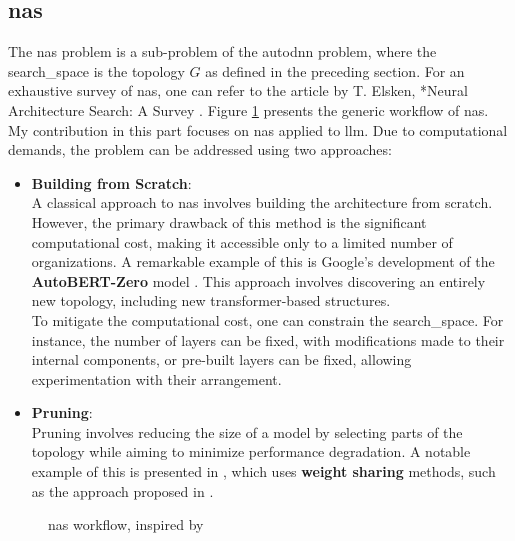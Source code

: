 \subsection{\acrfull{nas}}
\label{sec : nas}

The \acrfull{nas} problem is a sub-problem of the \acrshort{autodnn} problem, where the \gls{search_space} is the topology \( G \) as defined in the preceding section. For an exhaustive survey of \acrshort{nas}, one can refer to the article by T. Elsken, *Neural Architecture Search: A Survey \cite{elsken_neural_2019}. Figure \ref{fig:nas} presents the generic workflow of \acrshort{nas}. My contribution in this part focuses on \acrshort{nas} applied to \acrshort{llm}. Due to computational demands, the problem can be addressed using two approaches:

\begin{itemize}
    

    \item \textbf{Building from Scratch}:\\
    A classical approach to \acrlong{nas} involves building the architecture from scratch. However, the primary drawback of this method is the significant computational cost, making it accessible only to a limited number of organizations. A remarkable example of this is Google's development of the \textbf{AutoBERT-Zero} model \cite{gao_autobert-zero_2022}. This approach involves discovering an entirely new topology, including new transformer-based structures.\\
    To mitigate the computational cost, one can constrain the \gls{search_space}. For instance, the number of layers can be fixed, with modifications made to their internal components, or pre-built layers can be fixed, allowing experimentation with their arrangement.

    \item \textbf{Pruning}:\\
    Pruning involves reducing the size of a model by selecting parts of the topology while aiming to minimize performance degradation. A notable example of this is presented in \cite{klein_structural_2023}, which uses \textbf{weight sharing} methods, such as the approach proposed in \cite{pham_efficient_2018}.
\end{itemize}

\begin{figure}[h]
    \centering
    
    \caption{\acrlong{nas} workflow, inspired by \cite{elsken_neural_2019}}
    \label{fig:nas}
\end{figure}

